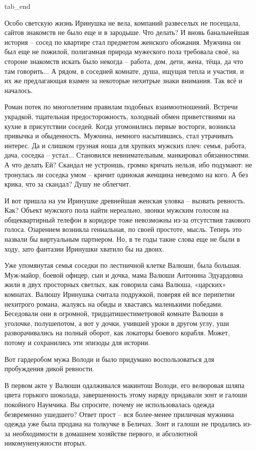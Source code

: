   tab_end
\fi

Особо светскую жизнь Иринушка не вела, компаний развеселых не посещала, сайтов
знакомств не было еще и в зародыше. Что делать? И вновь банальнейшая история –
сосед по квартире стал предметом женского обожания. Мужчина он был еще не
пожилой, полигамная природа мужеского пола требовала своё, на стороне знакомств
искать было некогда – работа, дом, дети, жена, тёща, да что там говорить... А
рядом, в соседней комнате, душа, ищущая тепла и участия, и их же предлагающая
взамен за некоторые нехитрые знаки внимания. Так всё и началось.

Роман потек по многолетним правилам подобных взаимоотношений. Встречи украдкой,
тщательная предосторожность, холодный обмен приветствиями на кухне в
присутствии соседей. Когда угомонились первые восторги, возникла привычка и
обыденность. Мужчина, немного насытившись, стал утрачивать интерес. Да и
слишком грузная ноша для хрупких мужских плеч: семья, работа, дача, соседка –
устал... Становился невнимательным, манкировал обязанностями. А что делать Ей?
Скандал не устроишь, громко кричать нельзя, ибо подумают: не тронулась ли
соседка умом – кричит одинокая женщина неведомо на кого. А без крика, что за
скандал? Душу не облегчит.

И вот пришла на ум Иринушке древнейшая женская уловка – вызвать ревность. Как?
Объект мужского пола найти нереально, звонки мужским голосом на общеквартирный
телефон в коридоре тоже невозможны из-за отсутствия такового голоса. Озарением
возникла гениальная, по своей простоте, мысль. Теперь это назвали бы
виртуальным партнером. Но, в те годы такие слова еще не были в ходу, зато
фантазии Иринушки хватило бы на двоих.

Уже упомянутая семья соседки по лестничной клетке Валюши, была большая.
Муж-майор, боевой офицер, сын и дочка, мама Валюши Антонина Эдуардовна жили в
двух просторных светлых, как говорила сама Валюша, «царских» комнатах. Валюшу
Иринушка считала подружкой, поверяя ей все перипетии нехитрого романа, жалуясь
на обиды и хвастаясь маленькими победами. Беседовали они в огромной,
тридцатишестиметровой комнате Валюши в уголочке, полушепотом, а вот у дочки,
учившей уроки в другом углу, уши разворачивались на полный оборот, как локаторы
боевого корабля. Может, потому и сохранились эти эпизоды для истории.

Вот гардеробом мужа Володи и было придумано воспользоваться для пробуждения
дикой ревности.

В первом акте у Валюши одалживался макинтош Володи, его велюровая шляпа цвета
горького шоколада, завершенность этому наряду придавали зонт и галоши покойного
Наумчика. Вы спросите, почему не использовалась одежда безвременно ушедшего?
Ответ прост – вся более-менее приличная мужнина одежда уже была продана на
толкучке в Беличах. Зонт и галоши не продались из-за необходимости в домашнем
хозяйстве первого, и абсолютной никомуненужности вторых.

